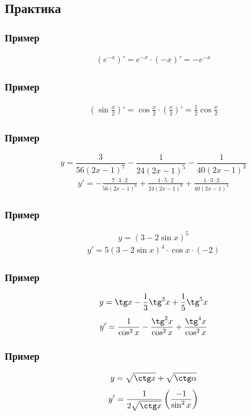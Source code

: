 \documentclass{article}
\begin{document}
\subsection{Практика}

\subsubsection{Пример}
\begin{gather*}
    (e^{-x})' = e^{-x} \cdot (-x)' = -e^{-x}
\end{gather*}

\subsubsection{Пример}
\begin{gather*}
    \left( \sin \frac{x}{2} \right)' = \cos \frac{x}{2} \cdot \left( \frac{x}{2} \right)' = \frac{1}{2} \cos \frac{x}{2}
\end{gather*}

\subsubsection{Пример}
\[
    y = \frac{3}{56(2x - 1)^7} - \frac{1}{24(2x - 1)^5} - \frac{1}{40(2x - 1)^3}
\]
\begin{gather*}
    y' = -\frac{7 \cdot 3 \cdot 2}{56(2x - 1)^8} + \frac{1 \cdot 5 \cdot 2}{24(2x - 1)^6} + \frac{1 \cdot 3 \cdot 2}{40(2x - 1)^4}
\end{gather*}

\subsubsection{Пример}
\[
    y = (3 - 2\sin x)^5
\]
\begin{gather*}
    y' = 5(3 - 2\sin x)^4 \cdot \cos x \cdot (-2)   
\end{gather*}

\subsubsection{Пример}
\[
    y = \tg x - \frac{1}{3} \tg^3 x + \frac{1}{5} \tg^5 x
\]
\begin{gather*}
    y' = \frac{1}{\cos^2 x} - \frac{\tg^2 x}{\cos^2 x} + \frac{\tg^4 x}{\cos^2 x}
\end{gather*}

\subsubsection{Пример}
\[
    y = \sqrt{\ctg x} + \sqrt{\ctg \alpha}
\]
\begin{gather*}
    y' = \frac{1}{2 \sqrt{\ctg x}} \left( \frac{-1}{\sin^2 x} \right)
\end{gather*}
\end{document}
